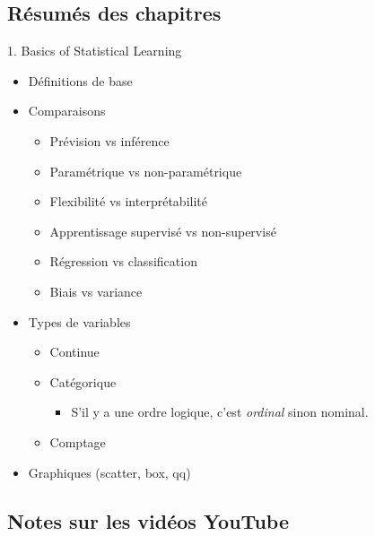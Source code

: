 \documentclass[12pt, titlepage, french]{report}
\begin{document}
\subsection{Résumés des chapitres}

\begin{CHPT_SUMM}[label = {BASICS}]{1. Basics of Statistical Learning}
	\begin{itemize}
		\item	Définitions de base
		\item	Comparaisons
		\begin{itemize}
			\item	Prévision vs inférence
			\item	Paramétrique vs non-paramétrique 
			\item	Flexibilité vs interprétabilité
			\item	Apprentissage supervisé vs non-supervisé
			\item	Régression vs classification
			\item	Biais vs variance 
		\end{itemize}
		\item	Types de variables
		\begin{itemize}
			\item	Continue
			\item	Catégorique
			\begin{itemize}
				\item[]	S'il y a une ordre logique, c'est \textit{ordinal} sinon nominal.
			\end{itemize}
			\item	Comptage
		\end{itemize}
		\item	Graphiques (scatter, box, qq)
	\end{itemize}
\end{CHPT_SUMM}

\subsection{Notes sur les vidéos YouTube}
\end{document}
